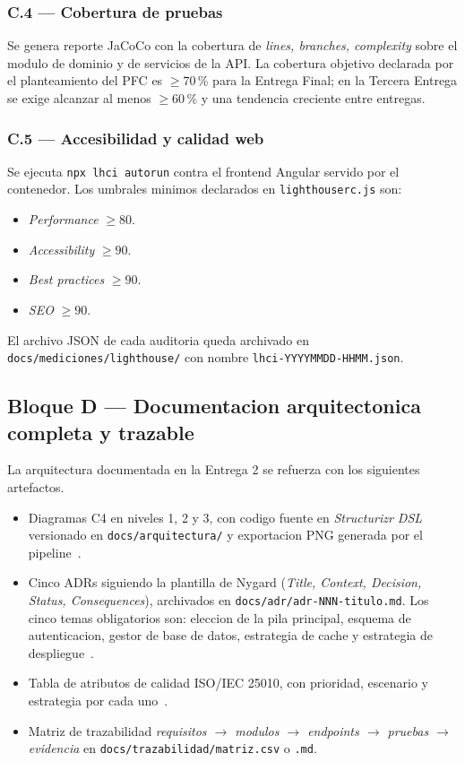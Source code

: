 \documentclass[11pt,a4paper]{article}
\begin{document}
\subsubsection*{C.4 --- Cobertura de pruebas}

Se genera reporte JaCoCo con la cobertura de \emph{lines, branches, complexity} sobre el modulo de dominio y de servicios de la API. La cobertura objetivo declarada por el planteamiento del PFC es $\geq 70$\,\% para la Entrega Final; en la Tercera Entrega se exige alcanzar al menos $\geq 60$\,\% y una tendencia creciente entre entregas.

\subsubsection*{C.5 --- Accesibilidad y calidad web}

Se ejecuta \texttt{npx lhci autorun} contra el frontend Angular servido por el contenedor. Los umbrales minimos declarados en \texttt{lighthouserc.js} son:

\begin{itemize}
    \item \emph{Performance} $\geq 80$.
    \item \emph{Accessibility} $\geq 90$.
    \item \emph{Best practices} $\geq 90$.
    \item \emph{SEO} $\geq 90$.
\end{itemize}

El archivo JSON de cada auditoria queda archivado en \texttt{docs/mediciones/lighthouse/} con nombre \texttt{lhci-YYYYMMDD-HHMM.json}.

\subsection{Bloque D --- Documentacion arquitectonica completa y trazable}

La arquitectura documentada en la Entrega 2 se refuerza con los siguientes artefactos.

\begin{itemize}
    \item Diagramas C4 en niveles 1, 2 y 3, con codigo fuente en \emph{Structurizr DSL} versionado en \texttt{docs/arquitectura/} y exportacion PNG generada por el pipeline~\cite{brown2023c4}.
    \item Cinco ADRs siguiendo la plantilla de Nygard (\emph{Title, Context, Decision, Status, Consequences}), archivados en \texttt{docs/adr/adr-NNN-titulo.md}. Los cinco temas obligatorios son: eleccion de la pila principal, esquema de autenticacion, gestor de base de datos, estrategia de cache y estrategia de despliegue~\cite{nygard2011adr}.
    \item Tabla de atributos de calidad ISO/IEC 25010, con prioridad, escenario y estrategia por cada uno~\cite{iso25010}.
    \item Matriz de trazabilidad \emph{requisitos $\rightarrow$ modulos $\rightarrow$ endpoints $\rightarrow$ pruebas $\rightarrow$ evidencia} en \texttt{docs/trazabilidad/matriz.csv} o \texttt{.md}.
\end{itemize}
\end{document}
